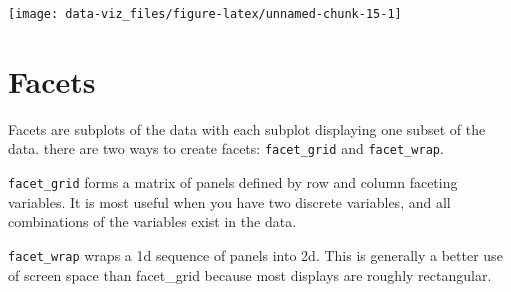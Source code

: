 \documentclass[]{book}
\theoremstyle{definition}
\theoremstyle{definition}
\theoremstyle{definition}
\theoremstyle{remark}
\begin{document}
\begin{center}\texttt{[image: data-viz\_files/figure-latex/unnamed-chunk-15-1]} \end{center}

\hypertarget{facets}{%
\section{Facets}\label{facets}}

Facets are subplots of the data with each subplot displaying one subset
of the data. there are two ways to create facets: \texttt{facet\_grid}
and \texttt{facet\_wrap}.

\texttt{facet\_grid} forms a matrix of panels defined by row and column
faceting variables. It is most useful when you have two discrete
variables, and all combinations of the variables exist in the data.

\texttt{facet\_wrap} wraps a 1d sequence of panels into 2d. This is
generally a better use of screen space than facet\_grid because most
displays are roughly rectangular.
\end{document}
